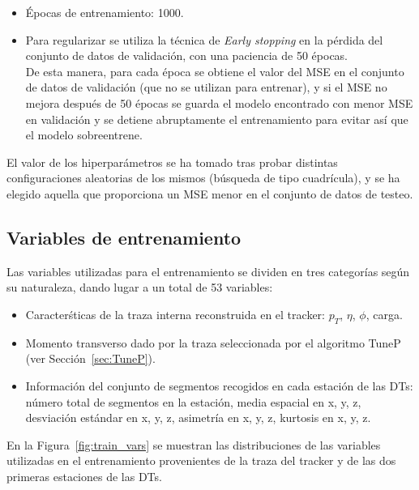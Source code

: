 \begin{itemize}
\item \'Epocas de entrenamiento: 1000.

\item Para regularizar se utiliza la t\'ecnica de \textit{Early stopping} en la p\'erdida del conjunto de datos de validaci\'on, con una paciencia de 50 \'epocas. \\
De esta manera, para cada \'epoca se obtiene el valor del MSE en el conjunto de datos de validaci\'on (que no se utilizan para entrenar), y si el MSE no mejora despu\'es de 50 \'epocas se guarda el modelo encontrado con menor MSE en validaci\'on y se detiene abruptamente el entrenamiento para evitar as\'i que el modelo sobreentrene. 

\end{itemize}

El valor de los hiperpar\'ametros se ha tomado tras probar distintas configuraciones aleatorias de los mismos (b\'usqueda de tipo cuadr\'icula), y se ha elegido aquella que proporciona un MSE menor en el conjunto de datos de testeo.


\subsection{Variables de entrenamiento}\label{sec:variables}

Las variables utilizadas para el entrenamiento se dividen en tres categor\'ias seg\'un su naturaleza, dando lugar a un total de 53 variables:

\begin{itemize}
\item Caracter\'sticas de la traza interna reconstruida en el tracker: $p_{T}$, $\eta$, $\phi$, carga.
\item Momento transverso dado por la traza seleccionada por el algoritmo TuneP (ver Secci\'on~\ref{sec:TuneP}).
\item Informaci\'on del conjunto de segmentos recogidos en cada estaci\'on de las DTs: n\'umero total de segmentos en la estaci\'on, media espacial en x, y, z, desviaci\'on est\'andar en x, y, z, asimetr\'ia en x, y, z, kurtosis en x, y, z.
\end{itemize}

En la Figura~\ref{fig:train_vars} se muestran las distribuciones de las variables utilizadas en el entrenamiento provenientes de la traza del tracker y de las dos primeras estaciones de las DTs. \

